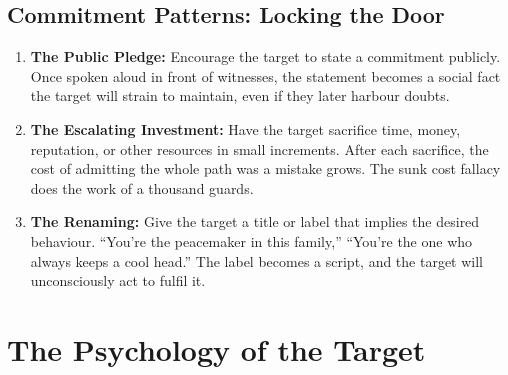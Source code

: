 \documentclass[12pt,a4paper,oneside]{book}
\begin{document}
\section{Commitment Patterns: Locking the Door}
\begin{enumerate}[leftmargin=*, label=\arabic*.]
\item \textbf{The Public Pledge:} Encourage the target to state a commitment publicly. Once spoken aloud in front of witnesses, the statement becomes a social fact the target will strain to maintain, even if they later harbour doubts.
\item \textbf{The Escalating Investment:} Have the target sacrifice time, money, reputation, or other resources in small increments. After each sacrifice, the cost of admitting the whole path was a mistake grows. The sunk cost fallacy does the work of a thousand guards.
\item \textbf{The Renaming:} Give the target a title or label that implies the desired behaviour. “You're the peacemaker in this family,” “You're the one who always keeps a cool head.” The label becomes a script, and the target will unconsciously act to fulfil it.
\end{enumerate}

\chapter{The Psychology of the Target}
\end{document}
